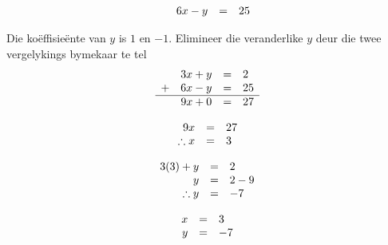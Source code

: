 \begin{aktiwiteit}{}
\begin{wex}
{\begin{equation*}
\begin{array}{ccll}
\hfill& 6x-y& =& 25\hfill 
\end{array}
\end{equation*}
}
{
Die ko\"effisie\"ente van $y$ is $1$ en $-1$. Elimineer die veranderlike $y$ deur die twee vergelykings bymekaar te tel
\begin{equation*}
\begin{array}{ccll}\hfill & 3x+y& =& 2\hfill \\ 
\hfill+ & 6x-y& =& 25\hfill \\ \hline
 \hfill & 9x + 0 &=& 27
\end{array}
\end{equation*}


\begin{equation*}
    \begin{array}{ccl}\hfill 9x& =& 27\hfill \\
	\hfill \therefore x  & =& 3\hfill 
    \end{array}
\end{equation*}

\begin{equation*}
    \begin{array}{ccl}\hfill 3(3) + y &=& 2\\
	\hfill y & =& 2-9\\
	\hfill \therefore y & =& -7 
   \end{array}
\end{equation*}


\begin{equation*}
\begin{array}{ccc}
 \hfill x& =& 3\hfill \\
\hfill y& =& -7\hfill 
\end{array}
\end{equation*}
}
\end{wex}


\end{aktiwiteit}

